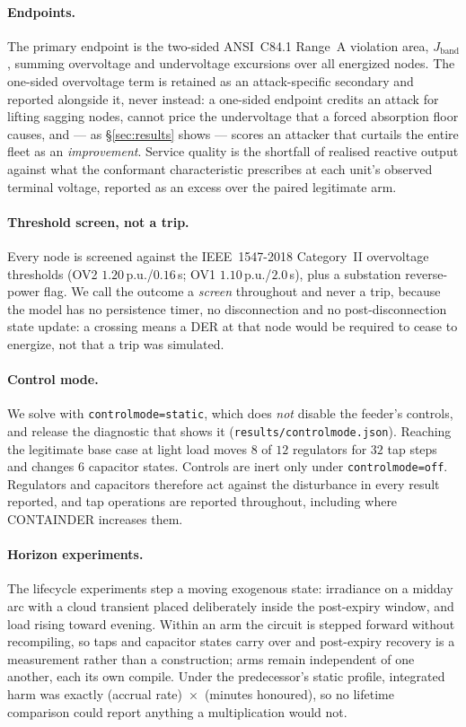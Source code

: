 \paragraph{Endpoints.}
The primary endpoint is the two-sided ANSI~C84.1 Range~A violation area, $J_{\mathrm{band}}$,
summing overvoltage and undervoltage excursions over all energized nodes. The one-sided
overvoltage term is retained as an attack-specific secondary and reported alongside it, never
instead: a one-sided endpoint credits an attack for lifting sagging nodes, cannot price the
undervoltage that a forced absorption floor causes, and --- as \S\ref{sec:results} shows --- scores
an attacker that curtails the entire fleet as an \emph{improvement}. Service quality is the
shortfall of realised reactive output against what the conformant characteristic prescribes at
each unit's observed terminal voltage, reported as an excess over the paired legitimate arm.

\paragraph{Threshold screen, not a trip.} Every node is screened against the IEEE~1547-2018
Category~II overvoltage thresholds (OV2 $1.20$\,p.u./$0.16$\,s; OV1 $1.10$\,p.u./$2.0$\,s), plus a
substation reverse-power flag. We call the outcome a \emph{screen} throughout and never a trip,
because the model has no persistence timer, no disconnection and no post-disconnection state
update: a crossing means a DER at that node would be required to cease to energize, not that a
trip was simulated.

\paragraph{Control mode.} We solve with \texttt{controlmode=static}, which does \emph{not} disable
the feeder's controls, and release the diagnostic that shows it
(\texttt{results/controlmode.json}). Reaching the legitimate base case at light load moves $8$ of
$12$ regulators for $32$ tap steps and changes $6$ capacitor states. Controls are inert only under
\texttt{controlmode=off}. Regulators and capacitors therefore act against the disturbance in every
result reported, and tap operations are reported throughout, including where CONTAINDER increases
them.

\paragraph{Horizon experiments.} The lifecycle experiments step a moving exogenous state:
irradiance on a midday arc with a cloud transient placed deliberately inside the post-expiry
window, and load rising toward evening. Within an arm the circuit is stepped forward without
recompiling, so taps and capacitor states carry over and post-expiry recovery is a measurement
rather than a construction; arms remain independent of one another, each its own compile. Under
the predecessor's static profile, integrated harm was exactly (accrual rate)~$\times$~(minutes
honoured), so no lifetime comparison could report anything a multiplication would not.
